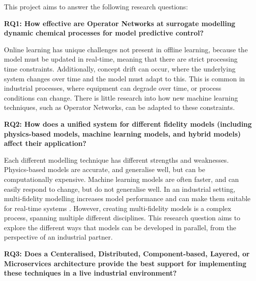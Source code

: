 \documentclass[12pt]{article}
\begin{document}
This project aims to answer the following research questions:

\textbf{RQ1: How effective are Operator Networks at surrogate modelling dynamic chemical processes for model predictive control?} %

Online learning has unique challenges not present in offline learning, because the model must be updated in real-time, meaning that there are strict processing time constraints. Additionally, concept drift can occur, where the underlying system changes over time and the model must adapt to this. This is common in industrial processes, where equipment can degrade over time, or process conditions can change. There is little research into how new machine learning techniques, such as Operator Networks, can be adapted to these constraints.

\textbf{RQ2: How does a unified system for different fidelity models (including physics-based models, machine learning models, and hybrid models) affect their application?} 

Each different modelling technique has different strengths and weaknesses. Physics-based models are accurate, and generalise well, but can be computationally expensive. Machine learning models are often faster, and can easily respond to change, but do not generalise well. In an industrial setting, multi-fidelity modelling increases model performance and can make them suitable for real-time systems \cite{cao2021simulation}. However, creating multi-fidelity models is a complex process, spanning multiple different disciplines. This research question aims to explore the different ways that models can be developed in parallel, from the perspective of an industrial partner.


\textbf{RQ3: Does a Centeralised, Distributed, Component-based, Layered, or Microservices architecture provide the best support for implementing these techniques in a live industrial environment?}
% 
\end{document}
